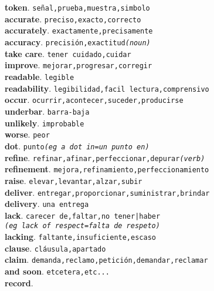 \documentclass[twocolumn]{article}
\begin{document}
	\textsf{\textbf{token}}. \texttt{se\~nal,prueba,muestra,simbolo}\\
	\textsf{\textbf{accurate}}. \texttt{preciso,exacto,correcto}\\
	\textsf{\textbf{accurately}}. \texttt{exactamente,precisamente}\\
	\textsf{\textbf{accuracy}}. \texttt{precisi\'on,exactitud{\scriptsize \textsl{(noun)}}}\\
	\textsf{\textbf{take care}}. \texttt{tener cuidado,cuidar}\\
	\textsf{\textbf{improve}}. \texttt{mejorar,progresar,corregir}\\
	\textsf{\textbf{readable}}. \texttt{legible}\\
	\textsf{\textbf{readability}}. \texttt{legibilidad,facil lectura,comprensivo}\\
	\textsf{\textbf{occur}}. \texttt{ocurrir,acontecer,suceder,producirse}\\
	\textsf{\textbf{underbar}}. \texttt{barra-baja}\\
	\textsf{\textbf{unlikely}}. \texttt{improbable}\\
	\textsf{\textbf{worse}}. \texttt{peor}\\
	\textsf{\textbf{dot}}. \texttt{punto{\scriptsize \textsl{(eg a dot in=un punto en)}}}\\
	\textsf{\textbf{refine}}. \texttt{refinar,afinar,perfeccionar,depurar{\scriptsize \textsl{(verb)}}}\\
	\textsf{\textbf{refinement}}. \texttt{mejora,refinamiento,perfeccionamiento}\\
	\textsf{\textbf{raise}}. \texttt{elevar,levantar,alzar,subir}\\
	\textsf{\textbf{deliver}}. \texttt{entregar,proporcionar,suministrar,brindar}\\
	\textsf{\textbf{delivery}}. \texttt{una entrega}\\
	\textsf{\textbf{lack}}. \texttt{carecer de,faltar,no tener|haber\\{\scriptsize \textsl{(eg lack of respect=falta de respeto)}}}\\
	\textsf{\textbf{lacking}}. \texttt{faltante,insuficiente,escaso}\\
	\textsf{\textbf{clause}}. \texttt{cl\'ausula,apartado}\\
	\textsf{\textbf{claim}}. \texttt{demanda,reclamo,petici\'on,demandar,reclamar}\\
	\textsf{\textbf{and soon}}. \texttt{etcetera,etc...}\\
	\textsf{\textbf{record}}.\\
\end{document}
